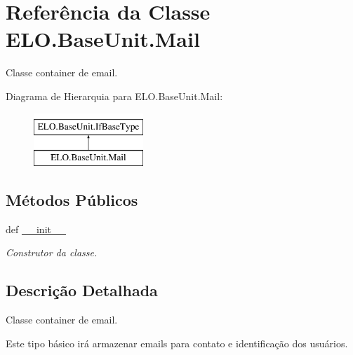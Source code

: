 \hypertarget{classELO_1_1BaseUnit_1_1Mail}{\section{Referência da Classe E\-L\-O.\-Base\-Unit.\-Mail}
\label{classELO_1_1BaseUnit_1_1Mail}
}


Classe container de email.  


Diagrama de Hierarquia para E\-L\-O.\-Base\-Unit.\-Mail\-:\begin{figure}[H]
\begin{center}
\leavevmode
\includegraphics[height=2.000000cm]{d5/db6/classELO_1_1BaseUnit_1_1Mail}
\end{center}
\end{figure}
\subsection*{Métodos Públicos}
\begin{DoxyCompactItemize}
\item 
def \hyperlink{classELO_1_1BaseUnit_1_1Mail_a7b9e31959dacc8c25ecae3e9bc0321aa}{\-\_\-\-\_\-init\-\_\-\-\_\-}
\begin{DoxyCompactList}\small\item\em Construtor da classe. \end{DoxyCompactList}\end{DoxyCompactItemize}


\subsection{Descrição Detalhada}
Classe container de email. 

Este tipo básico irá armazenar emails para contato e identificação dos usuários. 

